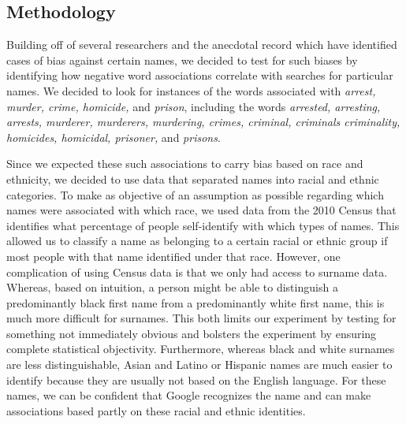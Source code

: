 \documentclass[sigconf]{acmart}
\begin{document}
\subsection{Methodology}

Building off of several researchers and the anecdotal record which have identified cases of bias against certain names, we decided to test for such biases by identifying how negative word associations correlate with searches for particular names. We decided to look for instances of the words associated with {\em arrest, murder, crime, homicide,} and {\em prison}, including the words {\em arrested, arresting, arrests, murderer, murderers, murdering, crimes, criminal, criminals criminality, homicides, homicidal, prisoner,} and {\em prisons}. 

Since we expected these such associations to carry bias based on race and ethnicity, we decided to use data that separated names into racial and ethnic categories. To make as objective of an assumption as possible regarding which names were associated with which race, we used data from the 2010 Census that identifies what percentage of people self-identify with which types of names. This allowed us to classify a name as belonging to a certain racial or ethnic group if most people with that name identified under that race. However, one complication of using Census data is that we only had access to surname data. Whereas, based on intuition, a person might be able to distinguish a predominantly black first name from a predominantly white first name, this is much more difficult for surnames. This both limits our experiment by testing for something not immediately obvious and bolsters the experiment by ensuring complete statistical objectivity. Furthermore, whereas black and white surnames are less distinguishable, Asian and Latino or Hispanic names are much easier to identify because they are usually not based on the English language. For these names, we can be confident that Google recognizes the name and can make associations based partly on these racial and ethnic identities.
\end{document}
